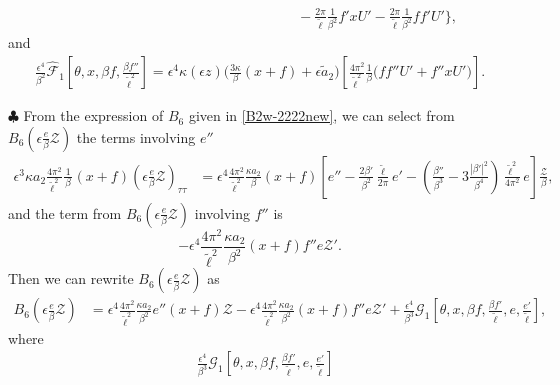 \documentclass[10pt, reqno]{amsart}
\numberwithin{equation}{section}
\theoremstyle{definition}
\begin{document}
{{\begin{align}
\nonumber\\[2mm]
&\qquad\qquad\qquad\qquad\qquad\qquad\qquad\qquad
-\frac{2\pi}{{\tilde\ell}}\frac{1}{ \beta^2}f' xU'
-\frac{2\pi}{{\tilde\ell}}\frac{1}{ \beta^2} ff' U'
\Bigg\},
\end{align}
and
\begin{align} \label{hat mathcal F1}
 \frac{\epsilon^4}{\beta^2} \hat{\mathcal F}_1\left[\theta, x, \beta f, \frac{\beta f''}{\tilde\ell^2} \right]
 = \epsilon^4 \kappa(\epsilon z) \Big( \frac{3\kappa}{\beta}(x+f) + \epsilon {\tilde a}_2 \Big) \left[\frac{4\pi^2}{{\tilde\ell}^2}\frac{1}{\beta} \big( ff''U' +f''xU'\big)
\right].
\end{align}



\smallskip
\noindent$\clubsuit$
From the expression of $B_6$ given in \eqref{B2w-2222new},
we can select from $B_6\left(\epsilon\frac{e}{\beta}{\mathcal Z} \right) $ the terms involving $e''$
\begin{align*}
\epsilon^3 \kappa a_2 \frac{ 4\pi^2} {{\tilde\ell}^2} \frac{1}{\, \beta\, }
 (x+f) \left(\epsilon\frac{e}{\beta}{\mathcal Z} \right) _{\tau\tau}
& =\epsilon^4\frac{ 4\pi^2} {{\tilde\ell}^2} \frac{\kappa a_2}{\, \beta\, } (x+f)
\left[e''- \frac{2\beta'} {\beta^2} \frac{\tilde \ell} {2\pi} e'
-\left(\frac{\beta''} {\beta^3} - 3\frac{|\beta'|^2} {\beta^4} \right) \frac{\tilde \ell^2} {4\pi^2}e
\right]\frac{\mathcal Z}\beta,
\end{align*}
and the term from $B_6\left(\epsilon\frac{e}{\beta}{\mathcal Z} \right) $ involving $f''$ is
\begin{equation*}
-\epsilon^4 \frac{ 4\pi^2} {{\tilde\ell}^2} \frac{\kappa a_2 }{\, \beta^2\, } (x+f) f'' e \mathcal Z' .
\end{equation*}
 Then we can rewrite $B_6\left(\epsilon\frac{e}{\beta}{\mathcal Z} \right) $ as
\begin{align}\label{expression of B6mathcal Z}
B_6\left(\epsilon\frac{e}{\beta}{\mathcal Z} \right) &
 =
\epsilon^4 \frac{4\pi^2} {{\tilde\ell}^2} \frac{\kappa a_2}{\, \beta^2\, } e'' (x+f)\mathcal Z
-\epsilon^4\frac{ 4\pi^2} {{\tilde\ell}^2}  \frac{ \kappa a_2 }{\, \beta^2\, } (x+f) f'' e \mathcal Z'
+\frac{\epsilon^4} {\beta^3} \mathcal G_1\left[\theta, x, \beta f, \frac{\beta f'}{\tilde\ell}, e, \frac{e'}{\tilde\ell}\right],
\end{align}
where
\begin{align} \label{mathcal G1}
& \frac{\epsilon^4} {\beta^3} \mathcal G_1\left[\theta, x, \beta f, \frac{\beta f'}{\tilde\ell}, e, \frac{e'}{\tilde\ell}\right]

\end{align}}}
\end{document}
